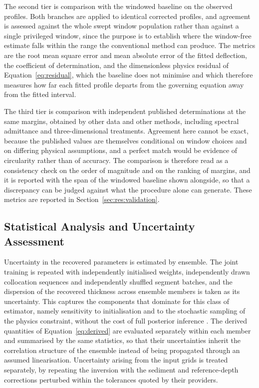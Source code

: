 \documentclass[final]{agujournal2019}
\begin{document}
The second tier is comparison with the windowed baseline on the observed
profiles. Both branches are applied to identical corrected profiles, and
agreement is assessed against the whole swept window population rather than
against a single privileged window, since the purpose is to establish where the
window-free estimate falls within the range the conventional method can produce.
The metrics are the root mean square error and mean absolute error of the fitted
deflection, the coefficient of determination, and the dimensionless physics
residual of Equation~\eqref{eq:residual}, which the baseline does not minimise
and which therefore measures how far each fitted profile departs from the
governing equation away from the fitted interval.

The third tier is comparison with independent published determinations at the
same margins, obtained by other data and other methods, including spectral
admittance and three-dimensional treatments. Agreement here cannot be exact,
because the published values are themselves conditional on window choices and on
differing physical assumptions, and a perfect match would be evidence of
circularity rather than of accuracy. The comparison is therefore read as a
consistency check on the order of magnitude and on the ranking of margins, and
it is reported with the span of the windowed baseline shown alongside, so that
a discrepancy can be judged against what the procedure alone can generate.
These metrics are reported in Section~\ref{sec:res:validation}.

\subsection{Statistical Analysis and Uncertainty Assessment}\label{sec:uncertainty}

Uncertainty in the recovered parameters is estimated by ensemble. The joint
training is repeated with independently initialised weights, independently drawn
collocation sequences and independently shuffled segment batches, and the
dispersion of the recovered thickness across ensemble members is taken as its
uncertainty. This captures the components that dominate for this class of
estimator, namely sensitivity to initialisation and to the stochastic sampling
of the physics constraint, without the cost of full posterior inference
\cite{Psaros2023}. The derived quantities of Equation~\eqref{eq:derived} are
evaluated separately within each member and summarised by the same statistics,
so that their uncertainties inherit the correlation structure of the ensemble
instead of being propagated through an assumed linearisation. Uncertainty
arising from the input grids is treated separately, by repeating the inversion
with the sediment and reference-depth corrections perturbed within the
tolerances quoted by their providers.
\end{document}
